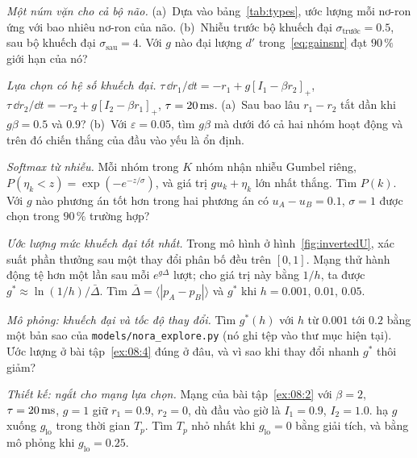 \begin{exercise}[\lvlA]
\label{ex:08:1}
\emph{Một núm vặn cho cả bộ não.} (a)~Dựa vào bảng~\ref{tab:types}, ước lượng mỗi nơ-ron  ứng với bao nhiêu nơ-ron của não. (b)~Nhiễu trước bộ khuếch đại $\sigma_{\text{trước}}=0.5$, sau bộ khuếch đại $\sigma_{\text{sau}}=4$. Với $g$ nào đại lượng $d'$ trong~\eqref{eq:gainsnr} đạt $90\,\%$ giới hạn của nó?
\end{exercise}

\begin{exercise}[\lvlB]
\label{ex:08:2}
\emph{Lựa chọn có hệ số khuếch đại.} $\tau\,\dd r_1/\dd t=-r_1+g[I_1-\beta r_2]_+$, $\tau\,\dd r_2/\dd t=-r_2+g[I_2-\beta r_1]_+$, $\tau=20\,\text{ms}$. (a)~Sau bao lâu $r_1-r_2$ tắt dần khi $g\beta=0.5$ và $0.9$? (b)~Với $\varepsilon=0.05$, tìm $g\beta$ mà dưới đó cả hai nhóm hoạt động và trên đó chiến thắng của đầu vào yếu là ổn định.
\end{exercise}

\begin{exercise}[\lvlA]
\label{ex:08:3}
\emph{Softmax từ nhiễu.} Mỗi nhóm trong $K$ nhóm nhận nhiễu Gumbel riêng, $P(\eta_k<z)=\exp(-e^{-z/\sigma})$, và giá trị $gu_k+\eta_k$ lớn nhất thắng. Tìm $P(k)$. Với $g$ nào phương án tốt hơn trong hai phương án có $u_A-u_B=0.1$, $\sigma=1$ được chọn trong $90\,\%$ trường hợp?
\end{exercise}

\begin{exercise}[\lvlB]
\label{ex:08:4}
\emph{Ước lượng mức khuếch đại tốt nhất.} Trong mô hình ở hình~\ref{fig:invertedU}, xác suất phần thưởng sau một thay đổi phân bố đều trên $[0,1]$. Mạng thử hành động tệ hơn một lần sau mỗi $e^{g\Delta}$ lượt; cho giá trị này bằng $1/h$, ta được $g^*\approx\ln(1/h)/\bar\Delta$. Tìm $\bar\Delta=\langle|p_A-p_B|\rangle$ và $g^*$ khi $h=0.001$, $0.01$, $0.05$.
\end{exercise}

\begin{exercise}[\lvlB]
\label{ex:08:5}
\emph{Mô phỏng: khuếch đại và tốc độ thay đổi.} Tìm $g^*(h)$ với $h$ từ $0.001$ tới $0.2$ bằng một bản sao của \texttt{models/\allowbreak nora\_explore.py} (nó ghi tệp vào thư mục hiện tại). Ước lượng ở bài tập~\ref{ex:08:4} đúng ở đâu, và vì sao khi thay đổi nhanh $g^*$ thôi giảm?
\end{exercise}

\begin{exercise}[\lvlB]
\label{ex:08:6}
\emph{Thiết kế: ngắt cho mạng lựa chọn.} Mạng của bài tập~\ref{ex:08:2} với $\beta=2$, $\tau=20\,\text{ms}$, $g=1$ giữ $r_1=0.9$, $r_2=0$, dù đầu vào giờ là $I_1=0.9$, $I_2=1.0$.  hạ $g$ xuống $g_{\text{lo}}$ trong thời gian $T_p$. Tìm $T_p$ nhỏ nhất khi $g_{\text{lo}}=0$ bằng giải tích, và bằng mô phỏng khi $g_{\text{lo}}=0.25$.
\end{exercise}

